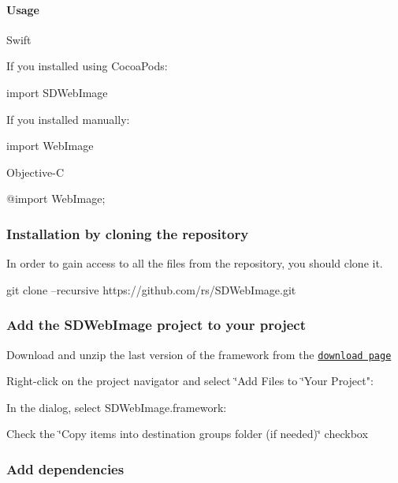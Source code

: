 \paragraph*{Usage}

Swift

If you installed using Cocoa\+Pods\+: 
\begin{DoxyCode}
import SDWebImage
\end{DoxyCode}


If you installed manually\+: 
\begin{DoxyCode}
import WebImage
\end{DoxyCode}


Objective-\/C


\begin{DoxyCode}
@import WebImage;
\end{DoxyCode}


\subsubsection*{Installation by cloning the repository}

In order to gain access to all the files from the repository, you should clone it. 
\begin{DoxyCode}
git clone --recursive https://github.com/rs/SDWebImage.git
\end{DoxyCode}


\subsubsection*{Add the S\+D\+Web\+Image project to your project}


\begin{DoxyItemize}
\item Download and unzip the last version of the framework from the \href{https://github.com/rs/SDWebImage/releases}{\tt download page}
\item Right-\/click on the project navigator and select \char`\"{}\+Add Files to \char`\"{}Your Project"\+:
\item In the dialog, select S\+D\+Web\+Image.\+framework\+:
\item Check the \char`\"{}\+Copy items into destination group\textquotesingle{}s folder (if needed)\char`\"{} checkbox
\end{DoxyItemize}

\subsubsection*{Add dependencies}


